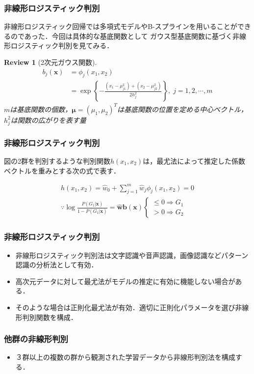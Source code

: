 \documentclass[dvipdfmx,cjk]{beamer}
\theoremstyle{example}
\newtheorem{review}[thm]{Review}
\begin{document}
\begin{frame}
    \frametitle{非線形ロジスティック判別}
    非線形ロジスティック回帰では多項式モデルやB-スプラインを用いることができるのであった．今回は具体的な基底関数として
    ガウス型基底関数に基づく非線形ロジスティック判別を見てみる．
    \begin{review}[2次元ガウス関数]
        \begin{align*}
            b_j(\boldsymbol{x}) & =\phi_j(x_1,x_2)                                                                          \\
                                & =\exp\left\{-\frac{(x_1-\mu_{j1}^2)+(x_2-\mu_{j2}^2)}{2h_j^2}\right\}, \; j=1,2,\cdots ,m
        \end{align*}
        $m$は基底関数の個数，$\boldsymbol{\mu}=(\mu_1,\mu_2)^T$は基底関数の位置を定める中心ベクトル，$h_j^2$は関数の広がりを表す量
    \end{review}
\end{frame}
\begin{frame}
    \frametitle{非線形ロジスティック判別}
    図の2群を判別するような判別関数$h(x_1,x_2)$は，最尤法によって推定した係数ベクトルを重みとする次の式で表す．

    \begin{align*}
        h(x_1,x_2)=\hat{w}_0+\sum_{j=1}^{m}\hat{w}_j\phi_j(x_1,x_2)=0 \\
        \because \log \frac{P(G_1|\boldsymbol{x})}{1-P(G_1|\boldsymbol{x})}=\hat{\boldsymbol{w}}\boldsymbol{b}(\boldsymbol{x})
        \begin{cases}
            \leq 0 \Rightarrow G_1 \\
            > 0 \Rightarrow G_2
        \end{cases}
    \end{align*}
\end{frame}

\begin{frame}
    \frametitle{非線形ロジスティック判別}
    \begin{itemize}
        \item 非線形ロジスティック判別法は文字認識や音声認識，画像認識などパターン認識の分析法として有効．
        \item 高次元データに対して最尤法がモデルの推定に有効に機能しない場合がある．
        \item そのような場合は正則化最尤法が有効．適切に正則化パラメータを選び非線形判別関数を構成．
    \end{itemize}
\end{frame}
\begin{frame}
    \frametitle{他群の非線形判別}
    \begin{itemize}
        \item ３群以上の複数の群から観測された学習データから非線形判別法を構成する．
    \end{itemize}
\end{frame}
\end{document}
